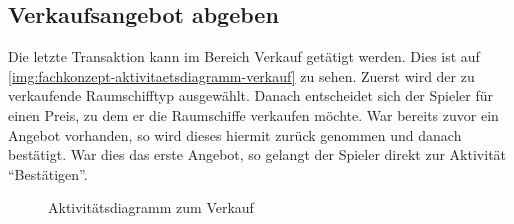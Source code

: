 \subsection{Verkaufsangebot abgeben}
\label{sec:fachkonzept-aktivitaetsdiagramm-verkauf}

Die letzte Transaktion kann im Bereich Verkauf getätigt werden. Dies ist auf \vref{img:fachkonzept-aktivitaetsdiagramm-verkauf} zu sehen. Zuerst wird der zu verkaufende Raumschifftyp ausgewählt. Danach entscheidet sich der Spieler für einen Preis, zu dem er die Raumschiffe verkaufen möchte. War bereits zuvor ein Angebot vorhanden, so wird dieses hiermit zurück genommen und danach bestätigt. War dies das erste Angebot, so gelangt der Spieler direkt zur Aktivität “Bestätigen”.

\begin{figure}[h]
  \centering
  \caption{Aktivitätsdiagramm zum Verkauf}
  \label{img:fachkonzept-aktivitaetsdiagramm-verkauf}
\end{figure}